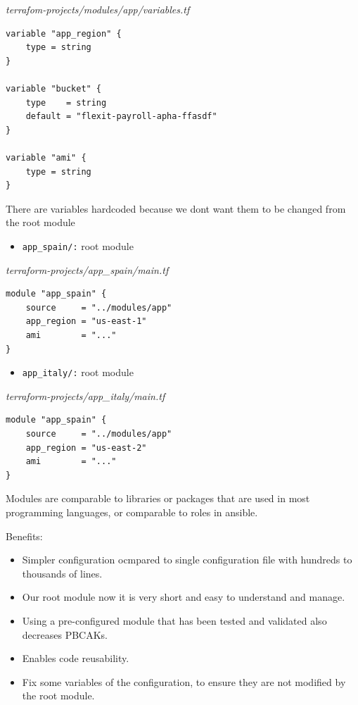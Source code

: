 \documentclass{article}
\newenvironment{blocktemplateIII}[1]{%
    \tcolorbox[beamer,%
    noparskip,breakable,
    ,colframe=Red,%
    colbacklower=LimeGreen!75!LightGreen,%
    title=#1]}%
    {\endtcolorbox}
\newenvironment{codetemplate}[1][]{%
  \mybasecolorbox[#1]
  \itshape
}{%
  \endmybasecolorbox
}
\begin{document}
\begin{codetemplate}{terrafom-projects/modules/app/variables.tf}
\begin{verbatim}
variable "app_region" {
    type = string
}

variable "bucket" {
    type    = string
    default = "flexit-payroll-apha-ffasdf"
}

variable "ami" {
    type = string
}
\end{verbatim}
\end{codetemplate}

\begin{blocktemplateIII}{WARNING}
There are variables hardcoded because we dont want them to be changed from the root module
\end{blocktemplateIII}

\newpage
\begin{itemize}
    \item \verb|app_spain/:| root module
\end{itemize}
\begin{codetemplate}{terraform-projects/app\_spain/main.tf}
\begin{verbatim}
module "app_spain" {
    source     = "../modules/app"
    app_region = "us-east-1"
    ami        = "..."
}
\end{verbatim}
\end{codetemplate}

\begin{itemize}
    \item \verb|app_italy/:| root module
\end{itemize}
\begin{codetemplate}{terraform-projects/app\_italy/main.tf}
\begin{verbatim}
module "app_spain" {
    source     = "../modules/app"
    app_region = "us-east-2"
    ami        = "..."
}
\end{verbatim}
\end{codetemplate}

Modules are comparable to libraries or packages that are used in most programming languages, or comparable to roles in ansible.

Benefits:
\begin{itemize}
    \item Simpler configuration ocmpared to single configuration file with hundreds to thousands of lines.
    \item Our root module now it is very short and easy to understand and manage.
    \item Using a pre-configured module that has been tested and validated also decreases PBCAKs.
    \item Enables code reusability.
    \item Fix some variables of the configuration, to ensure they are not modified by the root module.
\end{itemize}
\end{document}
